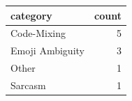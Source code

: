 \begin{tabular}{lr}
\toprule
category & count \\
\midrule
Code-Mixing & 5 \\
Emoji Ambiguity & 3 \\
Other & 1 \\
Sarcasm & 1 \\
\bottomrule
\end{tabular}
